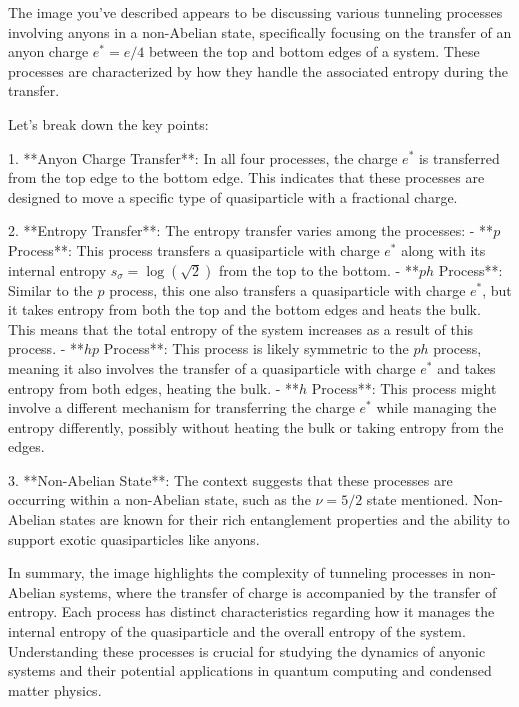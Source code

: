 The image you've described appears to be discussing various tunneling processes involving anyons in a non-Abelian state, specifically focusing on the transfer of an anyon charge \( e^* = e/4 \) between the top and bottom edges of a system. These processes are characterized by how they handle the associated entropy during the transfer.

Let's break down the key points:

1. **Anyon Charge Transfer**: In all four processes, the charge \( e^* \) is transferred from the top edge to the bottom edge. This indicates that these processes are designed to move a specific type of quasiparticle with a fractional charge.

2. **Entropy Transfer**: The entropy transfer varies among the processes:
   - **\( p \) Process**: This process transfers a quasiparticle with charge \( e^* \) along with its internal entropy \( s_\sigma = \log(\sqrt{2}) \) from the top to the bottom.
   - **\( ph \) Process**: Similar to the \( p \) process, this one also transfers a quasiparticle with charge \( e^* \), but it takes entropy from both the top and the bottom edges and heats the bulk. This means that the total entropy of the system increases as a result of this process.
   - **\( hp \) Process**: This process is likely symmetric to the \( ph \) process, meaning it also involves the transfer of a quasiparticle with charge \( e^* \) and takes entropy from both edges, heating the bulk.
   - **\( h \) Process**: This process might involve a different mechanism for transferring the charge \( e^* \) while managing the entropy differently, possibly without heating the bulk or taking entropy from the edges.

3. **Non-Abelian State**: The context suggests that these processes are occurring within a non-Abelian state, such as the \(\nu = 5/2\) state mentioned. Non-Abelian states are known for their rich entanglement properties and the ability to support exotic quasiparticles like anyons.

In summary, the image highlights the complexity of tunneling processes in non-Abelian systems, where the transfer of charge is accompanied by the transfer of entropy. Each process has distinct characteristics regarding how it manages the internal entropy of the quasiparticle and the overall entropy of the system. Understanding these processes is crucial for studying the dynamics of anyonic systems and their potential applications in quantum computing and condensed matter physics.